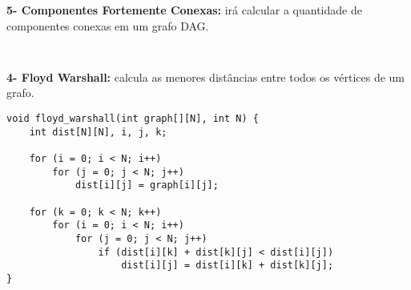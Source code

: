 \textbf{5- Componentes Fortemente Conexas:} irá calcular a quantidade de componentes conexas em um grafo DAG.
    \begin{verbatim}
    
    \end{verbatim}

\textbf{4- Floyd Warshall:} calcula as menores distâncias entre todos os vértices de um grafo.
    \begin{verbatim}
void floyd_warshall(int graph[][N], int N) {
    int dist[N][N], i, j, k;

    for (i = 0; i < N; i++)
        for (j = 0; j < N; j++)
            dist[i][j] = graph[i][j];

    for (k = 0; k < N; k++) 
        for (i = 0; i < N; i++) 
            for (j = 0; j < N; j++) 
                if (dist[i][k] + dist[k][j] < dist[i][j])
                    dist[i][j] = dist[i][k] + dist[k][j];
}
    \end{verbatim}
\pagebreak

